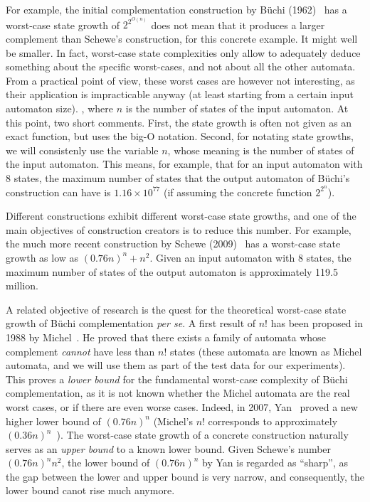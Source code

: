 For example, the initial complementation construction by Büchi (1962)~\cite{buchi1960decision} has a worst-case state growth of $2^{2^{O\left(n\right)}}$ does not mean that it produces a larger complement than Schewe's construction, for this concrete example. It might well be smaller. In fact, worst-case state complexities only allow to adequately deduce something about the specific worst-cases, and not about all the other automata. From a practical point of view, these worst cases are however not interesting, as their application is impracticable anyway (at least starting from a certain input automaton size). , where $n$ is the number of states of the input automaton. At this point, two short comments. First, the state growth is often not given as an exact function, but uses the big-O notation. Second, for notating state growths, we will consistenly use the variable $n$, whose meaning is the number of states of the input automaton. This means, for example, that for an input automaton with 8 states, the maximum number of states that the output automaton of Büchi's construction can have is $1.16 \times 10^{77}$ (if assuming the concrete function $2^{2^n}$).

Different constructions exhibit different worst-case state growths, and one of the main objectives of construction creators is to reduce this number. For example, the much more recent construction by Schewe (2009)~\cite{schewe2009buchi} has a worst-case state growth as low as $(0.76n)^n + n^2$. Given an input automaton with 8 states, the maximum number of states of the output automaton is approximately 119.5 million.

A related objective of research is the quest for the theoretical worst-case state growth of Büchi complementation \textit{per se}. A first result of $n!$ has been proposed in 1988 by Michel~\cite{michel1988}. He proved that there exists a family of automata whose complement \textit{cannot} have less than $n!$ states (these automata are known as Michel automata, and we will use them as part of the test data for our experiments). This proves a \textit{lower bound} for the fundamental worst-case complexity of Büchi complementation, as it is not known whether the Michel automata are the real worst cases, or if there are even worse cases. Indeed, in 2007, Yan~\cite{DBLP:journals/corr/abs-0802-1226} proved a new higher lower bound of $(0.76n)^n$ (Michel's $n!$ corresponds to approximately $(0.36n)^n$~\cite{DBLP:journals/corr/abs-0802-1226}). The worst-case state growth of a concrete construction naturally serves as an \textit{upper bound} to a known lower bound. Given Schewe's number $(0.76n)^n n^2$, the lower bound of $(0.76n)^n$ by Yan is regarded as ``sharp'', as the gap between the lower and upper bound is very narrow, and consequently, the lower bound canot rise much anymore.


